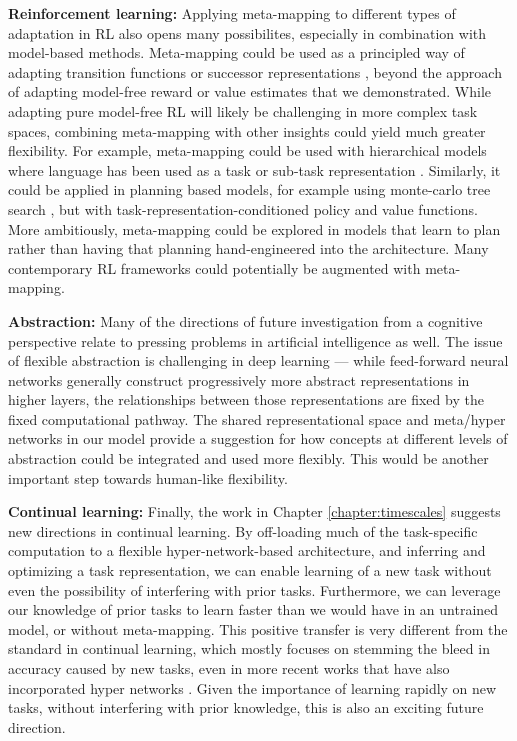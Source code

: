\textbf{Reinforcement learning:} Applying meta-mapping to different types of adaptation in RL also opens many possibilites, especially in combination with model-based methods. Meta-mapping could be used as a principled way of adapting transition functions or successor representations \citep[c.f.][]{Madarasz2019}, beyond the approach of adapting model-free reward or value estimates that we demonstrated. While adapting pure model-free RL will likely be challenging in more complex task spaces, combining meta-mapping with other insights could yield much greater flexibility. For example, meta-mapping could be used with hierarchical models where language has been used as a task or sub-task representation \citep[e.g.][]{Jiang2019}. Similarly, it could be applied in planning based models, for example using monte-carlo tree search \citep[as in e.g.][]{Silver2016, Silver2017}, but with task-representation-conditioned policy and value functions. More ambitiously, meta-mapping could be explored in models that learn to plan \citep{Guez2019} rather than having that planning hand-engineered into the architecture. Many contemporary RL frameworks could potentially be augmented with meta-mapping. \par

\textbf{Abstraction:} Many of the directions of future investigation from a cognitive perspective relate to pressing problems in artificial intelligence as well. The issue of flexible abstraction is challenging in deep learning --- while feed-forward neural networks generally construct progressively more abstract representations in higher layers, the relationships between those representations are fixed by the fixed computational pathway. The shared representational space and meta/hyper networks in our model provide a suggestion for how concepts at different levels of abstraction could be integrated and used more flexibly. This would be another important step towards human-like flexibility. \par 

\textbf{Continual learning:} Finally, the work in Chapter \ref{chapter:timescales} suggests new directions in continual learning. By off-loading much of the task-specific computation to a flexible hyper-network-based architecture, and inferring and optimizing a task representation, we can enable learning of a new task without even the possibility of interfering with prior tasks. Furthermore, we can leverage our knowledge of prior tasks to learn faster than we would have in an untrained model, or without meta-mapping. This positive transfer is very different from the standard in continual learning, which mostly focuses on stemming the bleed in accuracy caused by new tasks, even in more recent works that have also incorporated hyper networks \citep{Oswald2020}. Given the importance of learning rapidly on new tasks, without interfering with prior knowledge, this is also an exciting future direction. \par 

